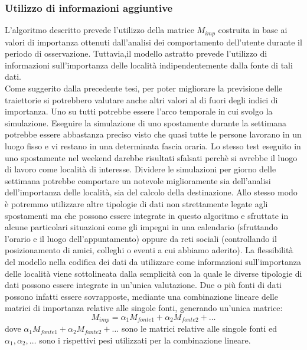 \subsubsection{Utilizzo di informazioni aggiuntive}
L'algoritmo descritto prevede l'utilizzo della matrice $M_{imp}$ costruita in base ai
valori di importanza ottenuti dall'analisi dei comportamento dell'utente durante
il periodo di osservazione. Tuttavia,il modello astratto prevede l'utilizzo
di informazioni sull'importanza delle localit\`a indipendentemente dalla fonte di
tali dati.\\
Come suggerito dalla precedente tesi, per poter migliorare la previsione delle traiettorie
si potrebbero valutare anche altri valori al di fuori degli indici di importanza.
Uno su tutti potrebbe essere l'arco temporale in cui svolgo la simulazione.
Eseguire la simulazione di uno spostamente durante la settimana potrebbe essere abbastanza
preciso visto che quasi tutte le persone lavorano in un luogo fisso e vi restano in una determinata
fascia oraria. Lo stesso test eseguito in uno spostamente nel weekend darebbe risultati sfalsati perch\`e
si avrebbe il luogo di lavoro come localit\`a di interesse. Dividere le simulazioni
per giorno delle settimana potrebbe comportare un notevole miglioramente sia dell'analisi
dell'importanza delle localit\`a, sia del calcolo della destinazione.
Allo stesso modo \`e potremmo utilizzare altre tipologie di dati non strettamente legate
agli spostamenti ma che possono essere integrate in questo algoritmo e
sfruttate in alcune particolari situazioni come gli impegni in una calendario
(sfruttando l'orario e il luogo dell'appuntamento) oppure
da reti sociali (controllando il posizionamento di amici, colleghi o eventi a cui abbiamo aderito).
La flessibilit\`a del modello nella codifica dei dati da utilizzare come informazioni
sull'importanza delle localit\`a viene sottolineata dalla semplicit\`a con
la quale le diverse tipologie di dati possono essere integrate in un'unica valutazione.
Due o pi\`u fonti di dati possono infatti essere sovrapposte, mediante una
combinazione lineare delle matrici di importanza relative alle singole fonti, generando un'unica matrice:
\begin{equation}
M_{imp} = \alpha_{1}M_{fonte1} + \alpha_{2}M_{fonte2} + \dots
\end{equation}
dove $\alpha_{1}M_{fonte1} + \alpha_{2}M_{fonte2} + \dots$ sono le matrici relative
alle singole fonti ed $\alpha_{1},\alpha_{2},\dots$
sono i rispettivi pesi utilizzati per la combinazione lineare.
